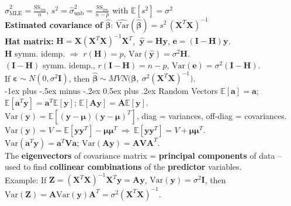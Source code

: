 \documentclass[10pt,landscape]{article}
\makeatletter
\renewcommand{\subsection}{\@startsection{subsection}{2}{0mm}%
                                {-1ex plus -.5ex minus -.2ex}%
                                {0.5ex plus .2ex}%
                                {\normalfont\small\bfseries}}
\makeatother
\begin{document}
\begin{multicols}{3}
$\widehat{\sigma}^2_{\mathrm{MLE}} = \frac{\mathrm{SS}_\mathrm{res}}{n}$, \quad
$s^2 = \widehat{\sigma}^2_{\mathrm{unb}} = \frac{\mathrm{SS}_\mathrm{res}}{n-p}$ with $\mathbb{E}[s^2]=\sigma^2$\\
\medskip
\textbf{Estimated covariance of } $\widehat{\boldsymbol{\beta}}$: 
$\widehat{\mathrm{Var}}(\widehat{\boldsymbol{\beta}})= s^2\,(\mathbf{X}^T \mathbf{X})^{-1}\,$\\
\medskip
\textbf{Hat matrix:} $\mathbf{H} = \mathbf{X}(\mathbf{X}^T \mathbf{X})^{-1}\mathbf{X}^T$, $\ \mathbf{\widehat y} = \mathbf{H}\mathbf {y}$, $\mathbf{e} = (\mathbf{I}-\mathbf{H})\mathbf{y}$.\\
$\mathbf{H}$ symm. idemp. $\Rightarrow$ $r(\mathbf{H}) = p$, $\mathrm{Var}(\mathbf{\widehat y}) = \sigma^2 \mathbf{H}$.\\
$(\mathbf{I}-\mathbf{H})$ symm. idemp., $r(\mathbf{I}-\mathbf{H}) = n-p$, $\mathrm{Var}(\mathbf{e}) = \sigma^2(\mathbf{I}-\mathbf{H})$.\\
\medskip
If $\boldsymbol\varepsilon \sim N(0,\sigma^2 \mathbf{I})$, then $\widehat{\boldsymbol{\beta}} \sim MVN\big(\boldsymbol{\beta},\ \sigma^2 (\mathbf{X}^T \mathbf{X})^{-1}\big)$.\\
\medskip
\subsection{Random Vectors}
$\mathbb{E}[\mathbf{a}] = \mathbf{a}$; $\mathbb{E}[\mathbf{a}^T \mathbf{y}] = \mathbf{a}^T \mathbb{E}[\mathbf{y}]$; $\mathbb{E}[\mathbf{A}\mathbf{y}] = \mathbf{A}\mathbb{E}[\mathbf{y}]$.\\
\medskip
$\mathrm{Var}(\mathbf{y}) = \mathbb{E}[(\mathbf{y}-\boldsymbol\mu)(\mathbf{y}-\boldsymbol\mu)^T]$, diag = variances, off-diag = covariances.\\
$\mathrm{Var}(\mathbf{y}) = V = \mathbb{E}[\mathbf{y}\mathbf{y}^T] - \boldsymbol\mu\boldsymbol\mu^T \ \Rightarrow\ \mathbb{E}[\mathbf{y}\mathbf{y}^T] = V + \boldsymbol\mu\boldsymbol\mu^T$.\\
$\mathrm{Var}(\mathbf{a}^T \mathbf{y}) = \mathbf{a}^T \mathbf{V} \mathbf{a}$; \quad $\mathrm{Var}(\mathbf{A}\mathbf{y}) = \mathbf{A}\mathbf{V}\mathbf{A}^T$.\\
The \textbf{eigenvectors} of covariance matrix = \textbf{principal components} of data -- used to find \textbf{collinear combinations} of the \textbf{predictor} variables.\\
\medskip
Example: If $\mathbf{Z} = (\mathbf{X}^T \mathbf{X})^{-1} \mathbf{X}^T \mathbf{y} = \mathbf{A}\mathbf{y}$, $\mathrm{Var}(\mathbf{y}) = \sigma^2 \mathbf{I}$, then $\mathrm{Var}(\mathbf{Z}) = \mathbf{A}\mathrm{Var}(\mathbf{y})\mathbf{A}^T = \sigma^2 (\mathbf{X}^T \mathbf{X})^{-1}$.\\
\medskip\medskip

\end{multicols}
\end{document}
